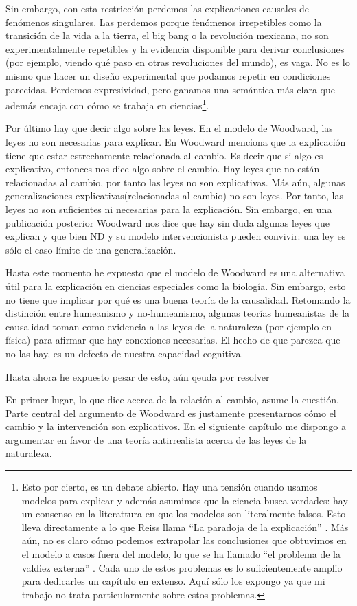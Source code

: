 Sin embargo, con esta restricción perdemos las explicaciones causales de fenómenos singulares. Las perdemos porque fenómenos irrepetibles como la transición de la vida a la tierra, el big bang o la revolución mexicana, no son experimentalmente repetibles y la evidencia disponible para derivar conclusiones (por ejemplo, viendo qué paso en otras revoluciones del mundo), es vaga. No es lo mismo que hacer un diseño experimental que podamos repetir en condiciones parecidas. Perdemos expresividad, pero ganamos una semántica más clara que además encaja con cómo se trabaja en ciencias\footnote{Esto por cierto, es un debate abierto. Hay una tensión cuando usamos modelos para explicar y además asumimos que la ciencia busca verdades: hay un consenso en la literattura en que los modelos son literalmente falsos. Esto lleva directamente a lo que Reiss llama ``La paradoja de la explicación'' \citeyear{Reiss2012}. Más aún, no es claro cómo podemos extrapolar las conclusiones que obtuvimos en el modelo a casos fuera del modelo, lo que se ha llamado ``el problema de la valdiez externa'' \cite{Reiss2019}. Cada uno de estos problemas es lo suficientemente amplio para dedicarles un capítulo en extenso. Aquí sólo los expongo ya que mi trabajo no trata particularmente sobre estos problemas.}.

Por último hay que decir algo sobre las leyes. En el modelo de Woodward, las leyes no son necesarias para explicar. En \cite{Woodward2000} Woodward menciona que la explicación tiene que estar estrechamente relacionada al cambio. Es decir que si algo es explicativo, entonces nos dice algo sobre el cambio. Hay leyes que no están relacionadas al cambio, por tanto las leyes no son explicativas. Más aún, algunas generalizaciones explicativas(relacionadas al cambio) no son leyes. Por tanto, las leyes no son suficientes ni necesarias para la explicación. Sin embargo, en una publicación posterior \citeyear{Woodward2003} Woodward nos dice que hay sin duda algunas leyes que explican y que bien ND y su modelo intervencionista pueden convivir: una ley es sólo el caso límite de una generalización.

Hasta este momento he expuesto que el modelo de Woodward es una alternativa útil para la explicación en ciencias especiales como la biología. Sin embargo, esto no tiene que implicar por qué es una buena teoría de la causalidad. Retomando la distinción entre humeanismo y no-humeanismo, algunas teorías humeanistas de la causalidad toman como evidencia a las leyes de la naturaleza (por ejemplo en física) para afirmar que hay conexiones necesarias. El hecho de que parezca que no las hay, es un defecto de nuestra capacidad cognitiva.

Hasta ahora he expuesto pesar de esto, aún qeuda por resolver

En primer lugar, lo que dice acerca de la relación al cambio, asume la cuestión. Parte central del argumento de Woodward es justamente presentarnos cómo el cambio y la intervención son explicativos. En el siguiente capítulo me dispongo a argumentar en favor de una teoría antirrealista acerca de las leyes de la naturaleza.

